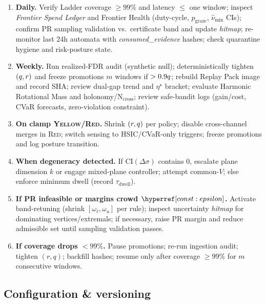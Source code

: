 \begin{enumerate}[leftmargin=*]
\item \textbf{Daily.}
Verify Ladder coverage $\ge 99\%$ and latency $\le$ one window; inspect \emph{Frontier Spend Ledger} and Frontier Health (duty-cycle, $p_{\mathrm{graze}}$, $\hat\nu_{\min}$ CIs); confirm PR sampling validation vs.\ certificate band and update \emph{hitmap}; re-monitor last 24h automata with \emph{consumed\_evidence} hashes; check quarantine hygiene and risk-posture state.
\item \textbf{Weekly.}
Run realized-FDR audit (synthetic null); deterministically tighten $(q,r)$ and freeze promotions $m$ windows if $>0.9q$; rebuild Replay Pack image and record SHA; review dual-gap trend and $\eta^\star$ bracket; evaluate Harmonic Rotational Mass and holonomy/N$_{\mathrm{cross}}$; review safe-bandit logs (gain/cost, CVaR forecasts, zero-violation constraint).
\item \textbf{On clamp \textsc{Yellow/Red}.}
Shrink $(r,q)$ per policy; disable cross-channel merges in \textsc{Red}; switch sensing to HSIC/CVaR-only triggers; freeze promotions and log posture transition.
\item \textbf{When degeneracy detected.}
If CI$(\Delta\sigma)$ contains $0$, escalate plane dimension $k$ or engage mixed-plane controller; attempt common-$V$; else enforce minimum dwell (record $\tau_{\mathrm{dwell}}$).
\item \textbf{If PR infeasible or margins crowd $\constref{epsilon}$.}
Activate band-retuning (shrink $[\omega_\ell,\omega_u]$ per rule); inspect uncertainty \emph{hitmap} for dominating vertices/extremals; if necessary, raise PR margin and reduce admissible set until sampling validation passes.
\item \textbf{If coverage drops $<99\%$.}
Pause promotions; re-run ingestion audit; tighten $(r,q)$; backfill hashes; resume only after coverage $\ge 99\%$ for $m$ consecutive windows.
\end{enumerate}

\subsection*{Configuration \& versioning}

